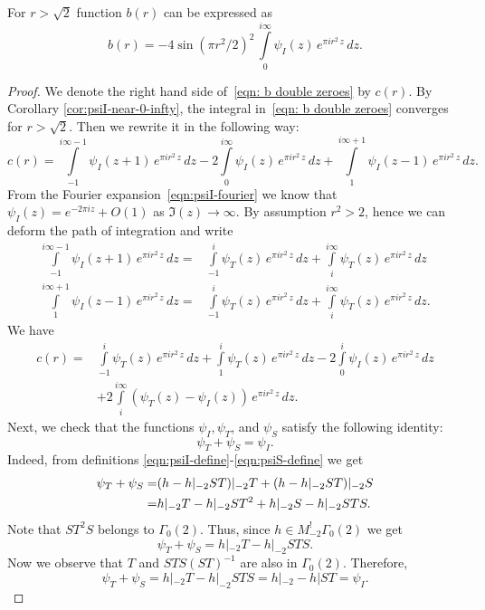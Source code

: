 \begin{proposition}\label{prop:b-double-zeros}\leanok
For $r>\sqrt{2}$ function $b(r)$ can be expressed as
\begin{equation}\label{eqn: b double zeroes}
    b(r)=-4\sin(\pi r^2/2)^2\,\int\limits_{0}^{i\infty}\psi_I(z)\,e^{\pi i r^2 \,z}\,dz.
\end{equation}
\end{proposition}
\begin{proof}\leanok
We denote the right hand side of~\eqref{eqn: b double zeroes} by $c(r)$.
By Corollary \ref{cor:psiI-near-0-infty}, the integral in~\eqref{eqn: b double zeroes} converges for $r>\sqrt{2}$.
Then we rewrite it in the following way:
$$c(r)=\int\limits_{-1}^{i\infty-1}\psi_I(z+1)\,e^{\pi i r^2 \,z}\,dz-2\int\limits_{0}^{i\infty}\psi_I(z)\,e^{\pi i r^2 \,z}\,dz+
\int\limits_{1}^{i\infty+1}\psi_I(z-1)\,e^{\pi i r^2 \,z}\,dz.$$
From the Fourier expansion~\eqref{eqn:psiI-fourier} we know that $\psi_I(z)=e^{-2\pi i z}+O(1)$ as $\Im(z)\to\infty$.
By assumption $r^2>2$, hence we can deform the path of integration and write
\begin{align}\label{eqn: inside proof 1}
\int\limits_{-1}^{i\infty-1}\psi_I(z+1)\,e^{\pi i r^2 \,z}\,dz=&
\int\limits_{-1}^{i}\psi_T(z)\,e^{\pi i r^2 \,z}\,dz+\int\limits_{i}^{i\infty}\psi_T(z)\,e^{\pi i r^2 \,z}\,dz\\
\int\limits_{1}^{i\infty+1}\psi_I(z-1)\,e^{\pi i r^2 \,z}\,dz=&
\int\limits_{-1}^{i}\psi_T(z)\,e^{\pi i r^2 \,z}\,dz+\int\limits_{i}^{i\infty}\psi_T(z)\,e^{\pi i r^2 \,z}\,dz.
\end{align}
We have
\begin{align}\label{eqn: c1}c(r)=&\int\limits_{-1}^{i}\psi_T(z)\,e^{\pi i r^2 \,z}\,dz+\int\limits_{1}^{i}\psi_T(z)\,e^{\pi i r^2 \,z}\,dz
-2\int\limits_{0}^{i}\psi_I(z)\,e^{\pi i r^2 \,z}\,dz\\
&+2\int\limits_{i}^{i\infty}(\psi_T(z)-\psi_I(z))\,e^{\pi i r^2 \,z}\,dz.
    \end{align}
Next, we check that the functions $\psi_I,\psi_T$, and $\psi_S$ satisfy the following identity:
\begin{equation}\label{eqn: c2}\psi_T+\psi_S=\psi_I.\end{equation}
Indeed, from definitions \eqref{eqn:psiI-define}-\eqref{eqn:psiS-define} we get
\begin{align}\psi_T+\psi_S=&(h-h|_{-2}ST)|_{-2}T+(h-h|_{-2}ST)|_{-2}S\notag\\
=&h|_{-2}T-h|_{-2}ST^2+h|_{-2}S-h|_{-2}STS.\notag\end{align}
Note that $ST^2S$ belongs to $\Gamma_0(2)$. Thus, since $h\in M^!_{-2}\Gamma_0(2)$ we get
$$\psi_T+\psi_S=h|_{-2}T-h|_{-2}STS. $$
Now we observe that $T$ and $STS(ST)^{-1}$ are also in $\Gamma_0(2)$. Therefore,
$$\psi_T+\psi_S=h|_{-2}T-h|_{-2}STS=h|_{-2}-h|ST=\psi_I.$$


\end{proof}
